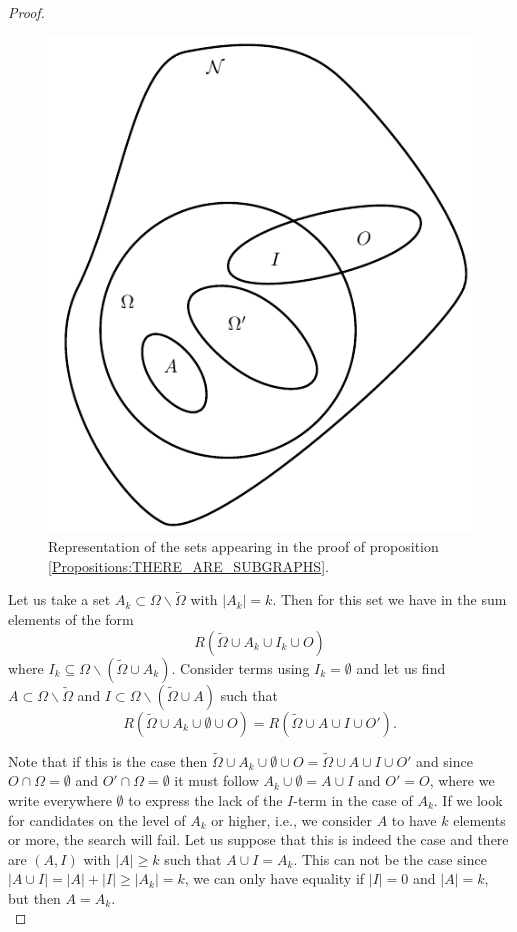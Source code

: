\documentclass[10pt, a4paper]{amsart}
\begin{document}
\begin{proof}
\begin{figure}[h]
\centering
\includegraphics[scale=.7]{images/proof_subgraph.pdf}
\caption{Representation of the sets appearing in the proof of proposition \ref{Propositions:THERE_ARE_SUBGRAPHS}. }
\label{fig:subgraph_proof}
\end{figure}

Let us take a set $A_{k}\subset \Omega \backslash\tilde{\Omega}$ with $|A_{k}| = k$. Then for this set we have in the sum elements of the form 
$$
R ( \tilde{\Omega} \cup A_{k} \cup I_{k} \cup O)
$$
where $ I_{k} \subseteq \Omega\backslash (\tilde{\Omega}\cup A_{k}) $. Consider  terms using $I_{k} = \emptyset$ and let us find  $A\subset \Omega\backslash \tilde{\Omega}$ and $I \subset \Omega \backslash (\tilde{\Omega}\cup A)$ such that 
\begin{equation}\label{Eq:prop:Subgraphs:Equality_of_R_functions}
R ( \tilde{\Omega} \cup A_{k} \cup \emptyset \cup O) = R ( \tilde{\Omega} \cup A \cup I \cup O').
\end{equation}


Note that if this is the case then $\tilde{\Omega} \cup A_{k} \cup \emptyset \cup O =   \tilde{\Omega} \cup A \cup I \cup O' $ and since $O\cap \Omega = \emptyset$ and $ O ' \cap \Omega = \emptyset$ it must follow $A_{k} \cup \emptyset  = A \cup I$ and $O' = O$, where we write everywhere $\emptyset $ to express the lack of the $I$-term in the case of $A_{k}$. If we look for candidates on the level of $A_{k}$ or higher, i.e., we consider $A$ to have $k$ elements or more, the search will fail. Let us suppose that this is indeed the case and there are $(A,I)$ with $|A|\geq k$ such that 
$A\cup I = A_{k}$. This can not be the case since $|A\cup I | = |A| + |I| \geq |A_{k}| = k $, we can only have equality if $|I| = 0$ and $|A| = k$, but then $A = A_{k}$. \\


\end{proof}
\end{document}
